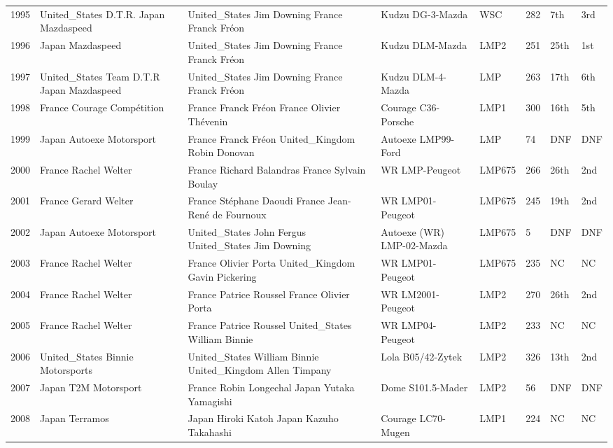 \documentclass{article}
\begin{document}
\begin{tabular}{llllllll}
1995 & United\_States D.T.R. Japan Mazdaspeed & United\_States Jim Downing France Franck Fréon & Kudzu DG-3-Mazda & WSC & 282 & 7th & 3rd \\
1996 & Japan Mazdaspeed & United\_States Jim Downing France Franck Fréon & Kudzu DLM-Mazda & LMP2 & 251 & 25th & 1st \\
1997 & United\_States Team D.T.R Japan Mazdaspeed & United\_States Jim Downing France Franck Fréon & Kudzu DLM-4-Mazda & LMP & 263 & 17th & 6th \\
1998 & France Courage Compétition & France Franck Fréon France Olivier Thévenin & Courage C36-Porsche & LMP1 & 300 & 16th & 5th \\
1999 & Japan Autoexe Motorsport & France Franck Fréon United\_Kingdom Robin Donovan & Autoexe LMP99-Ford & LMP & 74 & DNF & DNF \\
2000 & France Rachel Welter & France Richard Balandras France Sylvain Boulay & WR LMP-Peugeot & LMP675 & 266 & 26th & 2nd \\
2001 & France Gerard Welter & France Stéphane Daoudi France Jean-René de Fournoux & WR LMP01-Peugeot & LMP675 & 245 & 19th & 2nd \\
2002 & Japan Autoexe Motorsport & United\_States John Fergus United\_States Jim Downing & Autoexe (WR) LMP-02-Mazda & LMP675 & 5 & DNF & DNF \\
2003 & France Rachel Welter & France Olivier Porta United\_Kingdom Gavin Pickering & WR LMP01-Peugeot & LMP675 & 235 & NC & NC \\
2004 & France Rachel Welter & France Patrice Roussel France Olivier Porta & WR LM2001-Peugeot & LMP2 & 270 & 26th & 2nd \\
2005 & France Rachel Welter & France Patrice Roussel United\_States William Binnie & WR LMP04-Peugeot & LMP2 & 233 & NC & NC \\
2006 & United\_States Binnie Motorsports & United\_States William Binnie United\_Kingdom Allen Timpany & Lola B05/42-Zytek & LMP2 & 326 & 13th & 2nd \\
2007 & Japan T2M Motorsport & France Robin Longechal Japan Yutaka Yamagishi & Dome S101.5-Mader & LMP2 & 56 & DNF & DNF \\
2008 & Japan Terramos & Japan Hiroki Katoh Japan Kazuho Takahashi & Courage LC70-Mugen & LMP1 & 224 & NC & NC \\
\bottomrule
\end{tabular}
\end{document}
